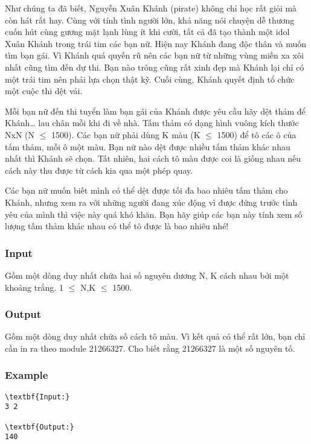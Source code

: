 



   Như chúng ta đã biết, Nguyễn Xuân Khánh (pirate) không chỉ học rất giỏi mà còn hát rất hay. Cùng với tính tình người lớn, khả năng nói chuyện dễ thương cuốn hút cùng gương mặt lạnh lùng ít khi cười, tất cả đã tạo thành một idol Xuân Khánh trong trái tim các bạn nữ. Hiện nay Khánh đang độc thân và muốn tìm bạn gái. Vì Khánh quá quyến rũ nên các bạn nữ từ những vùng miền xa xôi nhất cũng tìm đến dự thi. Bạn nào trông cũng rất xinh đẹp mà Khánh lại chỉ có một trái tim nên phải lựa chọn thật kỹ. Cuối cùng, Khánh quyết định tổ chức một cuộc thi dệt vải.   





   Mỗi bạn nữ đến thi tuyển làm bạn gái của Khánh được yêu cầu hãy dệt thảm để Khánh… lau chân mỗi khi đi về nhà. Tấm thảm có dạng hình vuông kích thước NxN (N $\le$ 1500). Các bạn nữ phải dùng K màu (K $\le$ 1500) để tô các ô của tấm thảm, mỗi ô một màu. Bạn nữ nào dệt được nhiều tấm thảm khác nhau nhất thì Khánh sẽ chọn. Tất nhiên, hai cách tô màu được coi là giống nhau nếu cách này thu được từ cách kia qua một phép quay.   





   Các bạn nữ muốn biết mình có thể dệt được tối đa bao nhiêu tấm thảm cho Khánh, nhưng xem ra với những người đang xúc động vì được đứng trước tình yêu của mình thì việc này quá khó khăn. Bạn hãy giúp các bạn này tính xem số lượng tấm thảm khác nhau có thể tô được là bao nhiêu nhé!  

\subsubsection{   Input  }




   Gồm một dòng duy nhất chứa hai số nguyên dương N, K cách nhau bởi một khoảng trắng. 1 $\le$ N,K $\le$ 1500.  

\subsubsection{   Output  }

   Gồm một dòng duy nhất chứa số cách tô màu. Vì kết quả có thể rất lớn, bạn chỉ cần in ra theo module 21266327. Cho biết rằng 21266327 là một số nguyên tố.  

\subsubsection{   Example  }
\begin{verbatim}
\textbf{Input:}
3 2

\textbf{Output:}
140
\end{verbatim}
